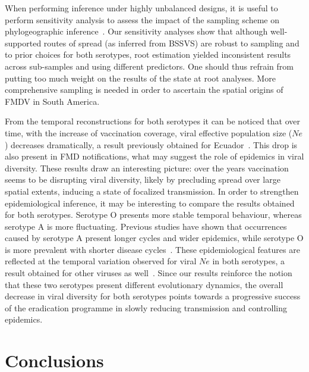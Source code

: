 \documentclass[10pt]{article}
\begin{document}

When performing inference under highly unbalanced designs, it is useful to perform sensitivity analysis to assess the impact of the sampling scheme on phylogeographic inference~\cite{Faria2012, polar, fluPNAS}. 
Our sensitivity analyses show that although well-supported routes of spread (as inferred from BSSVS) are robust to sampling and to prior choices for both serotypes, root estimation yielded inconsistent results across sub-samples and using different predictors.
One should thus refrain from putting too much weight on the results of the state at root analyses. 
More comprehensive sampling is needed in order to ascertain the spatial origins of FMDV in South America.


From the temporal reconstructions for both serotypes it can be noticed that over time, with the increase of vaccination coverage, viral effective population size ($Ne$) decreases dramatically, a result previously obtained for Ecuador~\cite{Carvalho2013}.
This drop is also present in FMD notifications, what may suggest the role of epidemics in viral diversity.
These results draw an interesting picture: over the years vaccination seems to be disrupting viral diversity, likely by precluding spread over large spatial extents, inducing a state of focalized transmission.
In order to strengthen epidemiological inference, it may be interesting to compare the results obtained for both serotypes.
Serotype O presents more stable temporal behaviour, whereas serotype A is more fluctuating.
Previous studies have shown that occurrences caused by serotype A present longer cycles and wider epidemics, while serotype O is more prevalent with shorter disease cycles~\cite{colombiatime}.
These epidemiological features are reflected at the temporal variation observed for viral $Ne$ in both serotypes, a result obtained for other viruses as well~\cite{Bennett2010,Pybus2003}. 
Since our results reinforce the notion that these two serotypes present different evolutionary dynamics, the overall decrease in viral diversity for both serotypes points towards a progressive success of the eradication programme in slowly reducing transmission and controlling epidemics.


\section*{Conclusions}
\end{document}
